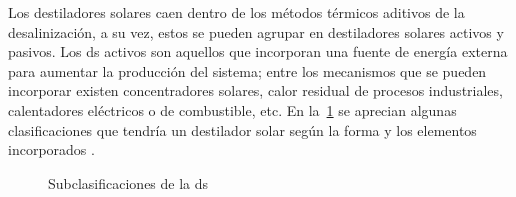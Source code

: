 		Los destiladores solares caen dentro de los métodos térmicos aditivos de la desalinización, a su vez, estos se pueden agrupar en destiladores solares activos y pasivos. Los \acrshort{ds} activos son aquellos que incorporan una fuente de energía externa para aumentar la producción del sistema; entre los mecanismos que se pueden incorporar existen concentradores solares, calor residual de procesos industriales, calentadores eléctricos o de combustible, etc. En la~\cref{fig:destilación-solar} se aprecian algunas clasificaciones que tendría un destilador solar según la forma y los elementos incorporados \cite{singh_active_2020}.
		
		\begin{figure}[H]
			\centering
			
			\caption{Subclasificaciones de la \acrlong{ds}}
			\label{fig:destilación-solar}
		\end{figure}
		
		